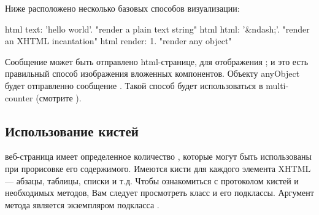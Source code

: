 \documentclass[a4paper,10pt,twoside]{book}
\begin{document}
Ниже расположено несколько базовых способов визуализации:
\begin{code}{}
html text: 'hello world'.  "render a plain text string"
html html: '&ndash;'.     "render an XHTML incantation"
html render: 1.              "render any object"
\end{code}


Сообщение  может быть отправлено html-странице,
для отображения ;
и это есть правильный способ изображения вложенных компонентов.
Объекту anyObject будет отправленно сообщение .
Такой способ будет использоваться в multi-counter
(смотрите ).


\subsection{Использование кистей}


веб-страница имеет определенное количество ,
которые могут быть использованы при прорисовке его содержимого.
Имеются кисти для каждого элемента XHTML --- абзацы, таблицы, списки и т.д.
Чтобы ознакомиться с  протоколом кистей и необходимых методов,
Вам следует просмотреть класс  и его подклассы.
Аргумент метода 
является экземпляром подкласса .

\end{document}
